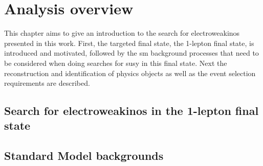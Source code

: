 
\chapter{Analysis overview}\label{ch:1lepton}

\ifpdf
    \graphicspath{{chapter-analysis/Figs/Raster/}{chapter-analysis/Figs/PDF/}{chapter-analysis/Figs/}}
\else
    \graphicspath{{chapter-analysis/Figs/Vector/}{chapter-analysis/Figs/}}
\fi


This chapter aims to give an introduction to the search for electroweakinos presented in this work. First, the targeted final state, the 1-lepton final state, is introduced and motivated, followed by the \gls{sm} background processes that need to be considered when doing searches for \gls{susy} in this final state. Next the reconstruction and identification of physics objects as well as the event selection requirements are described.

\section{Search for electroweakinos in the 1-lepton final state}


\section{Standard Model backgrounds}

